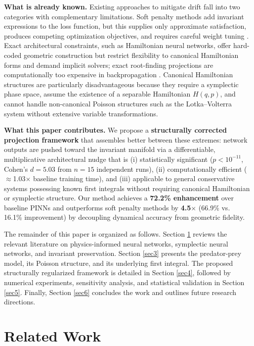 \documentclass[pdflatex,sn-mathphys-num]{sn-jnl}
\theoremstyle{thmstyleone}%
\theoremstyle{thmstyletwo}%
\theoremstyle{thmstylethree}%
\providecommand{\vs}{vs.\ }
\begin{document}
	\textbf{What is already known.} Existing approaches to mitigate drift fall into two categories with complementary limitations. Soft penalty methods add invariant expressions to the loss function, but this supplies only approximate satisfaction, produces competing optimization objectives, and requires careful weight tuning \cite{jagtap2020conservative,jin2020conservative}. Exact architectural constraints, such as Hamiltonian neural networks, offer hard-coded geometric construction but restrict flexibility to canonical Hamiltonian forms and demand implicit solvers; exact root-finding projections are computationally too expensive in backpropagation \cite{greydanus2019hamiltonian}. Canonical Hamiltonian structures are particularly disadvantageous because they require a symplectic phase space, assume the existence of a separable Hamiltonian $H(q,p)$, and cannot handle non-canonical Poisson structures such as the Lotka--Volterra system without extensive variable transformations.
	
	\textbf{What this paper contributes.} We propose a \textbf{structurally corrected projection framework} that assembles better between these extremes: network outputs are pushed toward the invariant manifold via a differentiable, multiplicative architectural nudge that is (i) statistically significant ($p < 10^{-11}$, Cohen's $d = 5.03$ from $n=15$ independent runs), (ii) computationally efficient ($\approx$1.03$\times$ baseline training time), and (iii) applicable to general conservative systems possessing known first integrals without requiring canonical Hamiltonian or symplectic structure. Our method achieves a \textbf{72.2\% enhancement} over baseline PINNs and outperforms soft penalty methods by \textbf{4.5$\times$} (66.9\% \vs{} 16.1\% improvement) by decoupling dynamical accuracy from geometric fidelity.
	
	The remainder of this paper is organized as follows. Section \ref{sec2} reviews the relevant literature on physics-informed neural networks, symplectic neural networks, and invariant preservation. Section \ref{sec3} presents the predator-prey model, its Poisson structure, and its underlying first integral. The proposed structurally regularized framework is detailed in Section \ref{sec4}, followed by numerical experiments, sensitivity analysis, and statistical validation in Section \ref{sec5}. Finally, Section \ref{sec6} concludes the work and outlines future research directions.
	
	\section{Related Work}\label{sec2}
	
\end{document}
